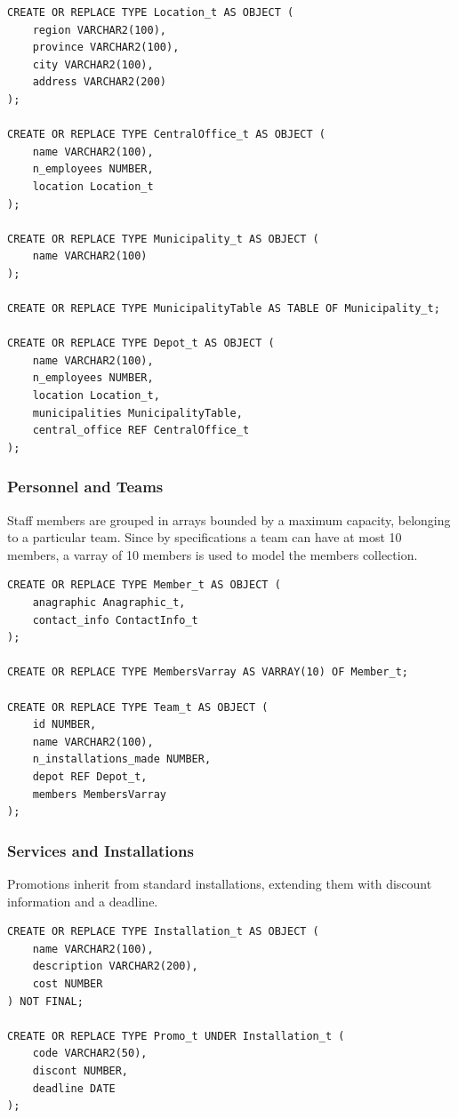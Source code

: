\begin{verbatim}
CREATE OR REPLACE TYPE Location_t AS OBJECT (
    region VARCHAR2(100),
    province VARCHAR2(100), 
    city VARCHAR2(100), 
    address VARCHAR2(200)
);

CREATE OR REPLACE TYPE CentralOffice_t AS OBJECT (
    name VARCHAR2(100), 
    n_employees NUMBER, 
    location Location_t
);

CREATE OR REPLACE TYPE Municipality_t AS OBJECT (
    name VARCHAR2(100)
);

CREATE OR REPLACE TYPE MunicipalityTable AS TABLE OF Municipality_t;

CREATE OR REPLACE TYPE Depot_t AS OBJECT (
    name VARCHAR2(100), 
    n_employees NUMBER, 
    location Location_t,
    municipalities MunicipalityTable,
    central_office REF CentralOffice_t
);
\end{verbatim}

\subsubsection{Personnel and Teams}
Staff members are grouped in arrays bounded by a maximum capacity, belonging to a particular team. Since by specifications a team can have at most 10 members, a varray of 10 members is used to model the members collection.

\begin{verbatim}
CREATE OR REPLACE TYPE Member_t AS OBJECT (
    anagraphic Anagraphic_t,
    contact_info ContactInfo_t
);

CREATE OR REPLACE TYPE MembersVarray AS VARRAY(10) OF Member_t;

CREATE OR REPLACE TYPE Team_t AS OBJECT (
    id NUMBER,
    name VARCHAR2(100), 
    n_installations_made NUMBER,
    depot REF Depot_t,
    members MembersVarray
);
\end{verbatim}

\subsubsection{Services and Installations}
Promotions inherit from standard installations, extending them with discount information and a deadline.

\begin{verbatim}
CREATE OR REPLACE TYPE Installation_t AS OBJECT (
    name VARCHAR2(100), 
    description VARCHAR2(200), 
    cost NUMBER
) NOT FINAL;

CREATE OR REPLACE TYPE Promo_t UNDER Installation_t (
    code VARCHAR2(50), 
    discont NUMBER, 
    deadline DATE
);
\end{verbatim}

